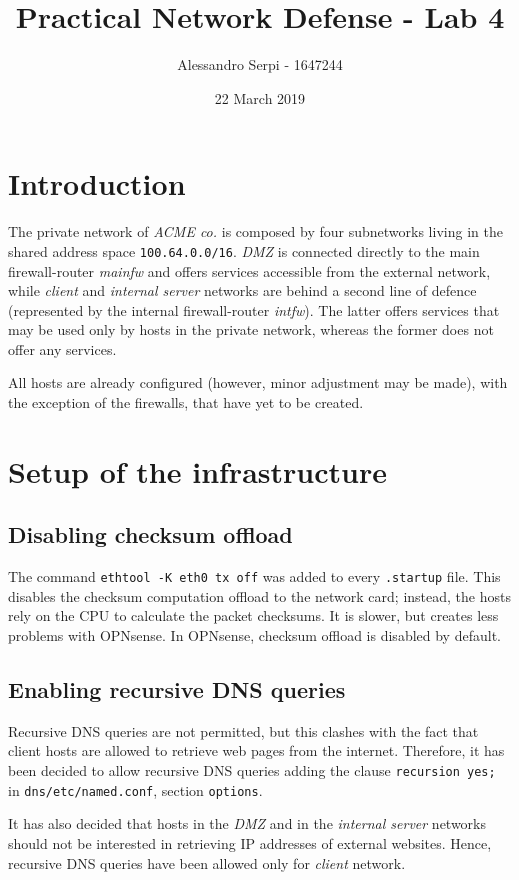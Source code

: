 \documentclass[draft]{homework}
\title{Practical Network Defense - Lab 4}
\author{Alessandro Serpi - 1647244}
\date{22 March 2019}
\newcommand{\opn}{OPNsense\xspace}
\newcommand{\client}{\textit{client}\xspace}
\newcommand{\dmz}{\textit{DMZ}\xspace}
\newcommand{\ser}{\textit{internal server}\xspace}
\newcommand{\intfw}{\textit{intfw}\xspace}
\newcommand{\mainfw}{\textit{mainfw}\xspace}
\begin{document}
    \maketitle
    \tableofcontents
    
    
    \section{Introduction}
    The private network of \textit{ACME co.} is composed by four subnetworks living in the shared address space \texttt{100.64.0.0/16}. \dmz is connected directly to the main firewall-router \mainfw and offers services accessible from the external network, while \client and \ser networks are behind a second line of defence (represented by the internal firewall-router \intfw). The latter offers services that may be used only by hosts in the private network, whereas the former does not offer any services.
    
    All hosts are already configured (however, minor adjustment may be made), with the exception of the firewalls, that have yet to be created. 
    
    
    \section{Setup of the infrastructure}
    \subsection{Disabling checksum offload}
    The command \texttt{ethtool -K eth0 tx off} was added to every \texttt{.startup} file. This disables the checksum computation offload to the network card; instead, the hosts rely on the CPU to calculate the packet checksums. It is slower, but creates less problems with \opn.
    In \opn, checksum offload is disabled by default.
    
    \subsection{Enabling recursive DNS queries}
    Recursive DNS queries are not permitted, but this clashes with the fact that client hosts are allowed to retrieve web pages from the internet. Therefore, it has been decided to allow recursive DNS queries adding the clause \texttt{recursion yes;} in \texttt{dns/etc/named.conf}, section \texttt{options}.
    
    It has also decided that hosts in the \dmz and in the \ser networks should not be interested in retrieving IP addresses of external websites. Hence, recursive DNS queries have been allowed only for \client network.
    
\end{document}

